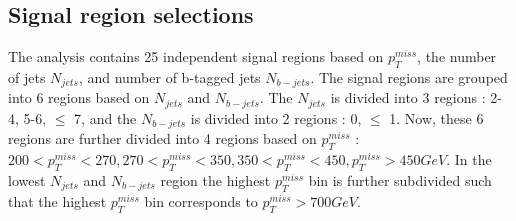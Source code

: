\documentclass[a4paper, 10pt]{article}
\begin{document}
\subsection{Signal region selections}
The analysis contains 25 independent signal regions based on $p_{T}^{miss}$, the number of jets $N_{jets}$, and number of b-tagged jets $N_{b-jets}$. The signal regions are grouped into 6 regions based on $N_{jets}$ and $N_{b-jets}$. The $N_{jets}$ is divided into 3 regions : 2-4, 5-6, $\leq$ 7, and the $N_{b-jets}$ is divided into 2 regions : 0, $\leq$ 1. Now, these 6 regions are further divided into 4 regions based on $p_{T}^{miss}$ : $200<p_{T}^{miss}<270, 270<p_{T}^{miss}<350, 350<p_{T}^{miss}<450, p_{T}^{miss}>450 GeV$. In the lowest $N_{jets}$ and $N_{b-jets}$ region the highest $p_{T}^{miss}$ bin is further subdivided such that the highest $p_{T}^{miss}$ bin corresponds to $p_{T}^{miss} > 700 GeV$.  
\end{document}
